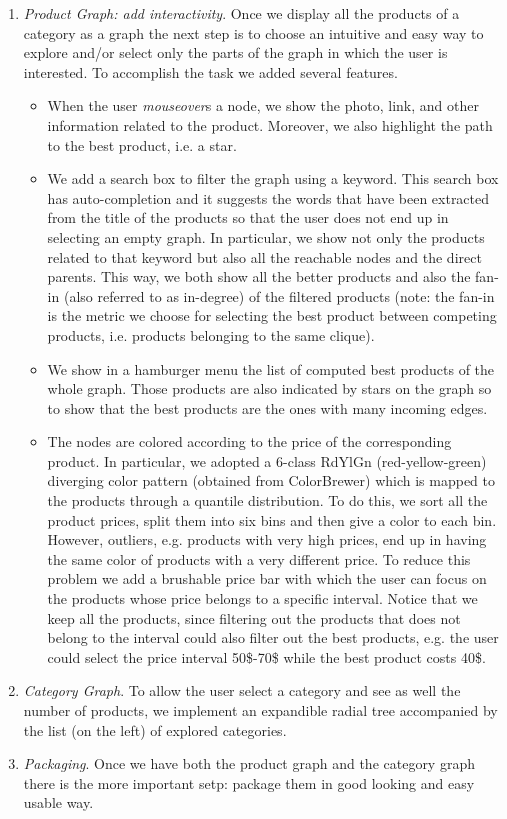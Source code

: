 \documentclass[a4paper,12pt]{article}
\begin{document}
\begin{enumerate}
	\item \textit{Product Graph: add interactivity}. Once we display all the products of a category as a graph the next step is to choose an intuitive and easy way to explore and/or select only the parts of the graph in which the user is interested. To accomplish the task we added several features.
		\begin{itemize}
			\item When the user \emph{mouseover}s a node, we show the photo, link, and other information related to the product. Moreover, we also highlight the path to the best product, i.e. a star.
			\item We add a search box to filter the graph using a keyword. This search box has auto-completion and it suggests the words that have been extracted from the title of the products so that the user does not end up in selecting an empty graph. In particular, we show not only the products related to that keyword but also all the reachable nodes and the direct parents. This way, we both show all the better products and also the fan-in (also referred to as in-degree) of the filtered products (note: the fan-in is the metric we choose for selecting the best product between competing products, i.e. products belonging to the same clique).
			\item We show in a hamburger menu the list of computed best products of the whole graph. Those products are also indicated by stars on the graph so to show that the best products are the ones with many incoming edges.
			\item The nodes are colored according to the price of the corresponding product. In particular, we adopted a 6-class RdYlGn (red-yellow-green) diverging color pattern (obtained from ColorBrewer) which is mapped to the products through a quantile distribution.
			To do this, we sort all the product prices, split them into six bins and then give a color to each bin. However, outliers, e.g. products with very high prices, end up in having the same color of products with a very different price. To reduce this problem we add a brushable price bar with which the user can focus on the products whose price belongs to a specific interval. Notice that we keep all the products, since filtering out the products that does not belong to the interval could also filter out the best products, e.g. the user could select the price interval 50\$-70\$ while the best product costs 40\$. 
		\end{itemize}

	\item \textit{Category Graph}. To allow the user select a category and see as well the number of products, we implement an expandible radial tree accompanied by the list (on the left) of explored categories. 

	\item \textit{Packaging}. Once we have both the product graph and the category graph there is the more important setp: package them in good looking and easy usable way.
\end{enumerate}
\end{document}
